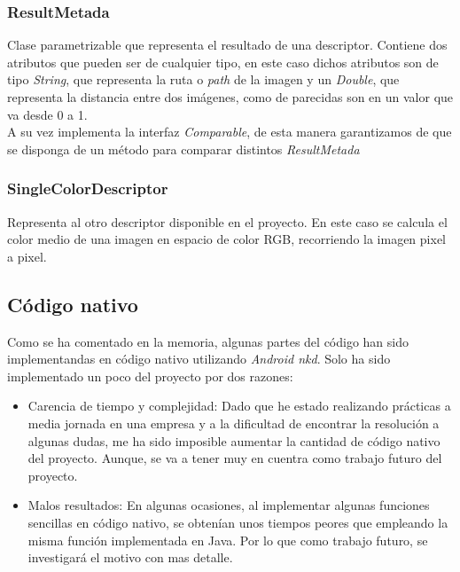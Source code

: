 \subsubsection{ResultMetada}

Clase parametrizable que representa el resultado de una descriptor. Contiene dos atributos que pueden ser de cualquier tipo, en este caso dichos atributos son de tipo \textit{String}, que representa la ruta o \textit{path} de la imagen y un \textit{Double}, que representa la distancia entre dos imágenes, como de parecidas son en un valor que va desde 0 a 1.\\

A su vez implementa la interfaz \textit{Comparable}, de esta manera garantizamos de que se disponga de un método para comparar distintos \textit{ResultMetada}

\subsubsection{SingleColorDescriptor}

Representa al otro descriptor disponible en el proyecto. En este caso se calcula el color medio de una imagen en espacio de color RGB, recorriendo la imagen pixel a pixel.

\subsection{Código nativo}

Como se ha comentado en la memoria, algunas partes del código han sido implementandas en código nativo utilizando \textit{Android nkd}. Solo ha sido implementado un poco del proyecto por dos razones:

\begin{itemize}
\item Carencia de tiempo y complejidad: Dado que he estado realizando prácticas a media jornada en una empresa y a la dificultad de encontrar la resolución a algunas dudas, me ha sido imposible aumentar la cantidad de código nativo del proyecto. Aunque, se va a tener muy en cuentra como trabajo futuro del proyecto.

\item Malos resultados: En algunas ocasiones, al implementar algunas funciones sencillas en código nativo, se obtenían unos tiempos peores que empleando la misma función implementada en Java. Por lo que como trabajo futuro, se investigará el motivo con mas detalle. 

\end{itemize} 

